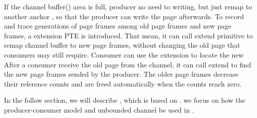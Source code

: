 If the channel buffer() area is full, 
producer no need to writing, 
but just remap  to another anchor ,
so that the producer can write the page afterwards.
To record and trace generations of page frames among old page frames 
and new page frames, a extension PTE is introduced.
That mean,
it can call extend primitive to remap channel buffer to new page frames,
without changing the old page that consumers may still require. 
Consumer can use the extension  to locate the new
After a consumer receive the old page from the channel, 
it can call extend to find the new page frames sended by the
producer.
The older page frames decrease their reference counts and
are freed automatically when the counts reach zero.






 







In the follow section, we will describe \myds, 
which is based on \myth.
we focus on how the producer-consumer model and unbounded channel be used in \myds.








